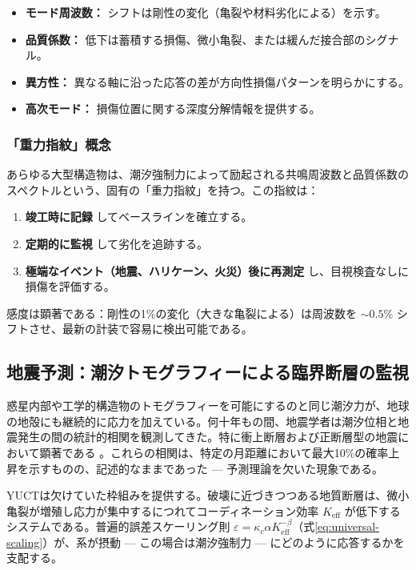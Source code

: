 \documentclass[12pt,a4paper]{article}
\theoremstyle{remark}
\begin{document}
	\begin{itemize}
		\item \textbf{モード周波数：} シフトは剛性の変化（亀裂や材料劣化による）を示す。
		\item \textbf{品質係数：} 低下は蓄積する損傷、微小亀裂、または緩んだ接合部のシグナル。
		\item \textbf{異方性：} 異なる軸に沿った応答の差が方向性損傷パターンを明らかにする。
		\item \textbf{高次モード：} 損傷位置に関する深度分解情報を提供する。
	\end{itemize}
	
	\subsubsection{「重力指紋」概念}
	
	あらゆる大型構造物は、潮汐強制力によって励起される共鳴周波数と品質係数のスペクトルという、固有の「重力指紋」を持つ。この指紋は：
	\begin{enumerate}
		\item \textbf{竣工時に記録} してベースラインを確立する。
		\item \textbf{定期的に監視} して劣化を追跡する。
		\item \textbf{極端なイベント（地震、ハリケーン、火災）後に再測定} し、目視検査なしに損傷を評価する。
	\end{enumerate}
	
	感度は顕著である：剛性の1\%の変化（大きな亀裂による）は周波数を \(\sim 0.5\%\) シフトさせ、最新の計装で容易に検出可能である。
	
	\subsection{地震予測：潮汐トモグラフィーによる臨界断層の監視}
	\label{sec:earthquakes}
	
	惑星内部や工学的構造物のトモグラフィーを可能にするのと同じ潮汐力が、地球の地殻にも継続的に応力を加えている。何十年もの間、地震学者は潮汐位相と地震発生の間の統計的相関を観測してきた。特に衝上断層および正断層型の地震において顕著である \cite{Tanaka2012, Tolstoy2013, Sibgatulin2014, RAN2025}。これらの相関は、特定の月距離において最大10\%の確率上昇を示すものの、記述的なままであった — 予測理論を欠いた現象である。
	
	YUCTは欠けていた枠組みを提供する。破壊に近づきつつある地質断層は、微小亀裂が増殖し応力が集中するにつれてコーディネーション効率 \(K_{\mathrm{eff}}\) が低下するシステムである。普遍的誤差スケーリング則 \(\varepsilon = \kappa_c \alpha K_{\mathrm{eff}}^{-\beta}\)（式\ref{eq:universal-scaling}）が、系が摂動 — この場合は潮汐強制力 — にどのように応答するかを支配する。
	
\end{document}
